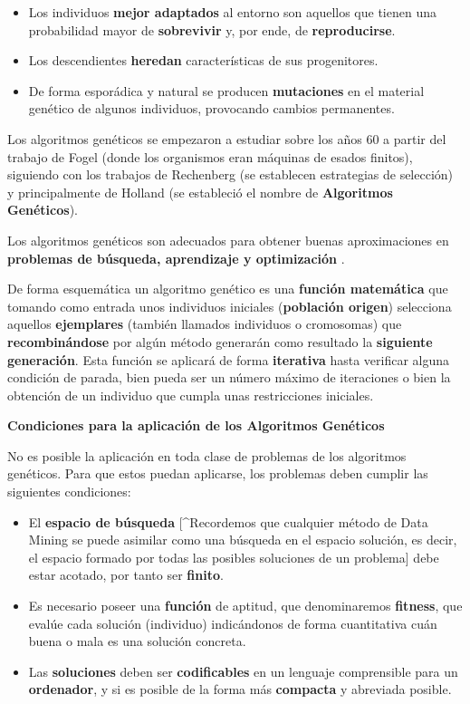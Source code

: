 \documentclass[
  a4paper,
  DIV=11,
  numbers=noendperiod]{scrreprt}
\begin{document}
\begin{itemize}
\item
  Los individuos \textbf{mejor adaptados} al entorno son aquellos que
  tienen una probabilidad mayor de \textbf{sobrevivir} y, por ende, de
  \textbf{reproducirse}.
\item
  Los descendientes \textbf{heredan} características de sus
  progenitores.
\item
  De forma esporádica y natural se producen \textbf{mutaciones} en el
  material genético de algunos individuos, provocando cambios
  permanentes.
\end{itemize}

Los algoritmos genéticos se empezaron a estudiar sobre los años 60 a
partir del trabajo de Fogel \autocite{fogel1966} (donde los organismos
eran máquinas de esados finitos), siguiendo con los trabajos de
Rechenberg \autocite{rechenberg1973} (se establecen estrategias de
selección) y principalmente de Holland \autocite{holland1975} (se
estableció el nombre de \textbf{Algoritmos Genéticos}).

Los algoritmos genéticos son adecuados para obtener buenas
aproximaciones en \textbf{problemas de búsqueda, aprendizaje y
optimización} \autocite{marczyk2004}.

De forma esquemática un algoritmo genético es una \textbf{función
matemática} que tomando como entrada unos individuos iniciales
(\textbf{población origen}) selecciona aquellos \textbf{ejemplares}
(también llamados individuos o cromosomas) que \textbf{recombinándose}
por algún método generarán como resultado la \textbf{siguiente
generación}. Esta función se aplicará de forma \textbf{iterativa} hasta
verificar alguna condición de parada, bien pueda ser un número máximo de
iteraciones o bien la obtención de un individuo que cumpla unas
restricciones iniciales.

\textbf{Condiciones para la aplicación de los Algoritmos Genéticos}

No es posible la aplicación en toda clase de problemas de los algoritmos
genéticos. Para que estos puedan aplicarse, los problemas deben cumplir
las siguientes condiciones:

\begin{itemize}
\item
  El \textbf{espacio de búsqueda} {[}\^{}Recordemos que cualquier método
  de Data Mining se puede asimilar como una búsqueda en el espacio
  solución, es decir, el espacio formado por todas las posibles
  soluciones de un problema{]} debe estar acotado, por tanto ser
  \textbf{finito}.
\item
  Es necesario poseer una \textbf{función} de aptitud, que denominaremos
  \textbf{fitness}, que evalúe cada solución (individuo) indicándonos de
  forma cuantitativa cuán buena o mala es una solución concreta.
\item
  Las \textbf{soluciones} deben ser \textbf{codificables} en un lenguaje
  comprensible para un \textbf{ordenador}, y si es posible de la forma
  más \textbf{compacta} y abreviada posible.
\end{itemize}
\end{document}
